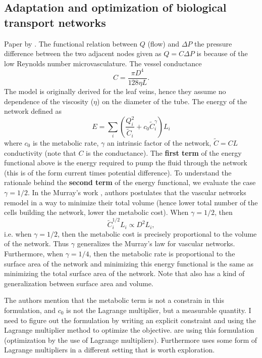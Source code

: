 \documentclass[10pt,a4paper,twocolumn]{article}
\begin{document}
	\subsection{Adaptation and optimization of biological transport networks}
	\label{Hu_Work}
	Paper by \cite{Hu2013}. The functional relation between $ Q $ (flow) and $ \Delta P $ the pressure difference between the two adjacent nodes given as $ Q = C \Delta P $ is because of the low Reynolds number microvasculature. The vessel conductance 
	\[ C = \frac{\pi D^4}{128 \eta L}. \]
	The model is originally derived for the leaf veins, hence they assume no dependence of the viscosity ($ \eta $) on the diameter of the tube. The energy of the network defined as
	\[ E = \sum_i\left(\frac{Q_i^2}{\tilde{C}_i} + c_0 \tilde{C}_i^\gamma\right) L_i \]
	where $ c_0 $ is the metabolic rate, $ \gamma $ an intrinsic factor of the network, $ \tilde{C} = C L $ conductivity (note that $ C $ is the conductance). The \textbf{first term} of the energy functional above is the energy required to pump the fluid through the network (this is of the form current times potential difference). To understand the rationale behind the \textbf{second term} of the energy functional, we evaluate the case $ \gamma = 1/2 $. In the Murray's work \cite{Murray1926}, authors postulates that the vascular networks remodel in a way to minimize their total volume (hence lower total number of the cells building the network, lower the metabolic cost). When $ \gamma = 1/2 $, then 
	\[ \tilde{C}_i^{1/2}L_i \propto D^2 L_i, \]
	i.e. when $ \gamma=1/2 $, then the metabolic cost is precisely proportional to the volume of the network. Thus $ \gamma $ generalizes the Murray's law for vascular networks. Furthermore, when $ \gamma = 1/4 $, then the metabolic rate is proportional to the surface area of the network and minimizing this energy functional is the same as minimizing the total surface area of the network. Note that \cite{Durand2006} also has a kind of generalization between surface area and volume.
	
	The authors mention that the metabolic term is not a constrain in this formulation, and $ c_0 $ is not the Lagrange multiplier, but a measurable quantity. I need to figure out the formulation by writing an explicit constraint and using the Lagrange multiplier method to optimize the objective. \cite{Durand2006,Bohn2007} are using this formulation (optimization by the use of Lagrange multipliers). Furthermore\cite{Almeida2022} uses some form of Lagrange multipliers in a different setting that is worth exploration.
	
\end{document}

